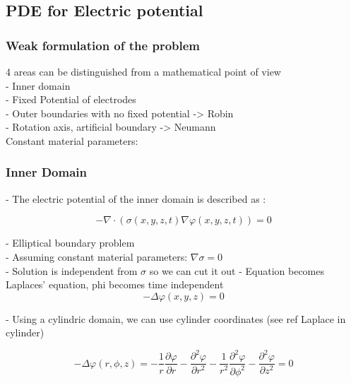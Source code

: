 \documentclass[parskip=half, titlepage=yes, 12pt, BCOR=12mm, DIV=calc]{scrartcl}
\begin{document}
\subsection{PDE for Electric potential}

\subsubsection{Weak formulation of the problem}
4 areas can be distinguished from a mathematical point of view \\
- Inner domain \\
- Fixed Potential of electrodes \\
- Outer boundaries with no fixed potential -> Robin \\
- Rotation axis, artificial boundary -> Neumann \\

Constant material parameters: \\

\subsubsection{Inner Domain}

- The electric potential of the inner domain is described as : 

\begin{equation}
    - \nabla \cdot (\sigma(x,y,z,t) \nabla \varphi(x,y,z,t)) = 0
\end{equation}

- Elliptical boundary problem \\
- Assuming constant material parameters: $\nabla \sigma = 0$ \\
- Solution is independent from $\sigma$ so we can cut it out
- Equation becomes Laplaces' equation, phi becomes time independent \\

\begin{equation}
    - \Delta \varphi(x,y,z) = 0
\end{equation}

- Using a cylindric domain, we can use cylinder coordinates (see ref Laplace in cylinder)

\begin{equation}
    - \Delta \varphi(r,\phi,z) = - \frac{1}{r} \frac{\partial \varphi}{\partial r} - \frac{\partial^2 \varphi}{\partial r^2} - \frac{1}{r^2} \frac{\partial^2 \varphi}{\partial \phi^2} -      \frac{\partial^2 \varphi}{\partial z^2}  = 0
\end{equation}
\end{document}
